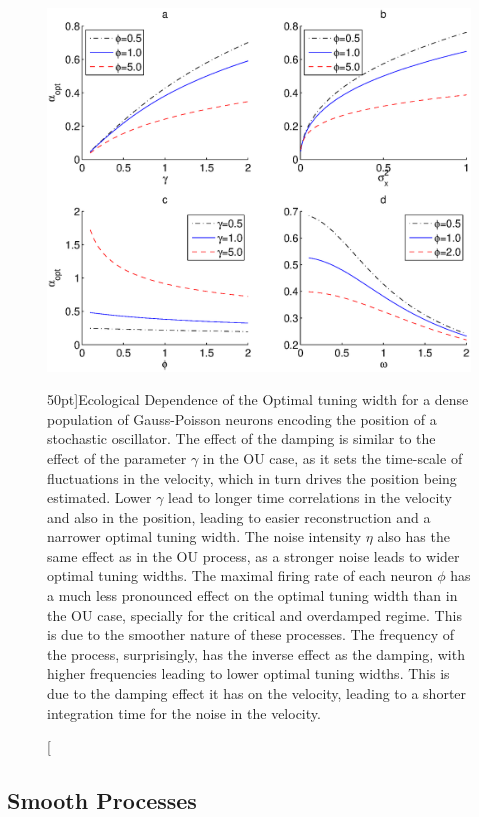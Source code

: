 \begin{figure}
\label{fig:ecological_osc}
\includegraphics[width=\columnwidth]{figures/figure_5_6.eps}
\caption[Ecological dependence of the optimal encoder for the stochastic oscillator.][50pt]{Ecological Dependence of the Optimal tuning width for a dense population of Gauss-Poisson neurons encoding the position of a stochastic oscillator. The effect of the damping is similar to the effect of the
parameter $\gamma$ in the OU case, as it sets the time-scale of fluctuations in the velocity, which in turn drives the position being estimated. Lower $\gamma$ lead to longer time correlations in the velocity and also in the position, leading to easier reconstruction and a narrower optimal tuning width. The noise intensity $\eta$ also has the same effect as in
the OU process, as a stronger noise leads to wider optimal tuning widths. The maximal firing rate of each neuron $\phi$ has a much less pronounced effect on the optimal tuning width
than in the OU case, specially for the critical and overdamped regime. This is due to the smoother nature of these processes. The  frequency of the process, surprisingly, has the 
inverse effect as the damping, with higher frequencies leading to lower optimal tuning widths. This is due to the damping effect it has on the velocity, leading to a shorter integration
time for the noise in the velocity.}
\end{figure}

\subsection{Smooth Processes}

